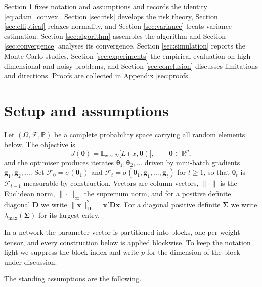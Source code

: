 \documentclass[pdflatex,sn-mathphys-num]{sn-jnl}%
\theoremstyle{thmstyleone}%
\theoremstyle{thmstyletwo}%
\theoremstyle{thmstylethree}%
\newcommand{\E}{\mathbb{E}}
\newcommand{\Real}{\mathbb{R}}
\begin{document}
Section \ref{sec:setup} fixes notation and assumptions and records the identity \eqref{eq:adam_convex}. Section \ref{sec:risk} develops the risk theory, Section \ref{sec:elliptical} relaxes normality, and Section \ref{sec:variance} treats variance estimation. Section \ref{sec:algorithm} assembles the algorithm and Section \ref{sec:convergence} analyses its convergence. Section \ref{sec:simulation} reports the Monte Carlo studies, Section \ref{sec:experiments} the empirical evaluation on high-dimensional and noisy problems, and Section \ref{sec:conclusion} discusses limitations and directions. Proofs are collected in Appendix \ref{sec:proofs}.

\section{Setup and assumptions}
\label{sec:setup}

Let $(\Omega,\mathcal F,\mathbb P)$ be a complete probability space carrying all random elements below. The objective is
\begin{equation}
J(\bm\theta)=\E_{x\sim\mathcal D}\bigl[L(x,\bm\theta)\bigr],
\qquad
\bm\theta\in\Real^{p},
\end{equation}
and the optimiser produces iterates $\bm\theta_1,\bm\theta_2,\dots$ driven by mini-batch gradients $\bm g_1,\bm g_2,\dots$. Set $\mathcal F_0=\sigma(\bm\theta_1)$ and $\mathcal F_t=\sigma(\bm\theta_1,\bm g_1,\dots,\bm g_t)$ for $t\ge1$, so that $\bm\theta_t$ is $\mathcal F_{t-1}$-measurable by construction. Vectors are column vectors, $\|\cdot\|$ is the Euclidean norm, $\|\cdot\|_\infty$ the supremum norm, and for a positive definite diagonal $\bm D$ we write $\|\bm x\|^2_{\bm D}=\bm x'\bm D\bm x$. For a diagonal positive definite $\bm\Sigma$ we write $\lambda_{\max}(\bm\Sigma)$ for its largest entry.

In a network the parameter vector is partitioned into blocks, one per weight tensor, and every construction below is applied blockwise. To keep the notation light we suppress the block index and write $p$ for the dimension of the block under discussion.

The standing assumptions are the following.
\end{document}
